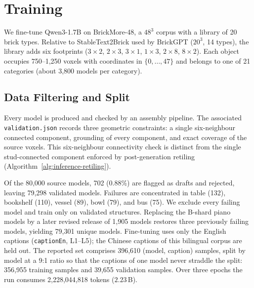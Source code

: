 \documentclass[10pt,twocolumn,letterpaper]{article}
\begin{document}
\section{Training}
\label{sec:training}
We fine-tune Qwen3-1.7B on BrickMore-48, a $48^3$ corpus with a library of 20 brick types. Relative to StableText2Brick used by BrickGPT ($20^3$, 14 types), the library adds six footprints ($3{\times}2$, $2{\times}3$, $3{\times}1$, $1{\times}3$, $2{\times}8$, $8{\times}2$). Each object occupies 750--1,250 voxels with coordinates in $\{0,\ldots,47\}$ and belongs to one of 21 categories (about 3,800 models per category).

\subsection{Data Filtering and Split}
Every model is produced and checked by an assembly pipeline. The associated \texttt{validation.json} records three geometric constraints: a single six-neighbour connected component, grounding of every component, and exact coverage of the source voxels. This six-neighbour connectivity check is distinct from the single stud-connected component enforced by post-generation retiling (Algorithm~\ref{alg:inference-retiling}).

Of the 80,000 source models, 702 (0.88\%) are flagged as drafts and rejected, leaving 79,298 validated models. Failures are concentrated in table (132), bookshelf (110), vessel (89), bowl (79), and bus (75). We exclude every failing model and train only on validated structures. Replacing the B-shard piano models by a later revised release of 1,905 models restores three previously failing models, yielding 79,301 unique models. Fine-tuning uses only the English captions (\texttt{captionEn}, L1--L5); the Chinese captions of this bilingual corpus are held out. The reported set comprises 396,610 (model, caption) samples, split by model at a 9:1 ratio so that the captions of one model never straddle the split: 356,955 training samples and 39,655 validation samples. Over three epochs the run consumes 2,228,044,818 tokens ($2.23$\,B).
\end{document}
